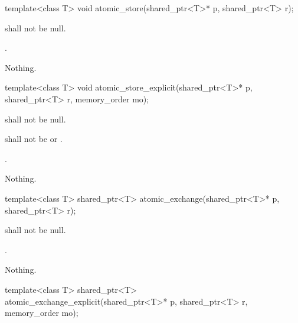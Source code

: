 %
%
\begin{itemdecl}
template<class T>
  void atomic_store(shared_ptr<T>* p, shared_ptr<T> r);
\end{itemdecl}

\begin{itemdescr}
\pnum
\requires {} shall not be null.

\pnum
\effects {}.

\pnum
\throws Nothing.
\end{itemdescr}

%
%
\begin{itemdecl}
template<class T>
  void atomic_store_explicit(shared_ptr<T>* p, shared_ptr<T> r, memory_order mo);
\end{itemdecl}

\begin{itemdescr}
\pnum
\requires {} shall not be null.

\pnum
\requires {} shall not be  or .

\pnum
\effects {}.

\pnum
\throws Nothing.
\end{itemdescr}

%
%
\begin{itemdecl}
template<class T>
  shared_ptr<T> atomic_exchange(shared_ptr<T>* p, shared_ptr<T> r);
\end{itemdecl}

\begin{itemdescr}
\pnum
\requires {} shall not be null.

\pnum
\returns {}.

\pnum
\throws Nothing.
\end{itemdescr}

%
%
\begin{itemdecl}
template<class T>
  shared_ptr<T> atomic_exchange_explicit(shared_ptr<T>* p, shared_ptr<T> r,
                                         memory_order mo);
\end{itemdecl}

